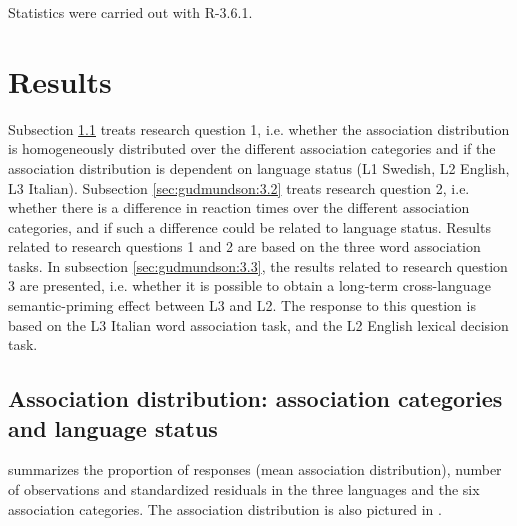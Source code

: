 \documentclass[output=paper,colorlinks,citecolor=brown,nonflat]{langsci/langscibook}
\begin{document}
Statistics were carried out with R-3.6.1.

\section{Results}\label{sec:gudmundson:3}

Subsection \ref{sec:gudmundson:3.1} treats research question 1, i.e. whether the association distribution is homogeneously distributed over the different association categories and if the association distribution is dependent on language status (L1 Swedish, L2 English, L3 Italian). Subsection \ref{sec:gudmundson:3.2} treats research question 2, i.e. whether there is a difference in reaction times over the different association categories, and if such a difference could be related to language status. Results related to research questions 1 and 2 are based on the three word association tasks. In subsection \ref{sec:gudmundson:3.3}, the results related to research question 3 are presented, i.e. whether it is possible to obtain a long-term cross-language semantic-priming effect between L3 and L2. The response to this question is based on the L3 Italian word association task, and the L2 English lexical decision task.

\subsection{Association distribution: association categories and language status}\label{sec:gudmundson:3.1}

 summarizes the proportion of responses (mean association distribution), number of observations and standardized residuals in the three languages and the six association categories. The association distribution is also pictured in .
\end{document}
